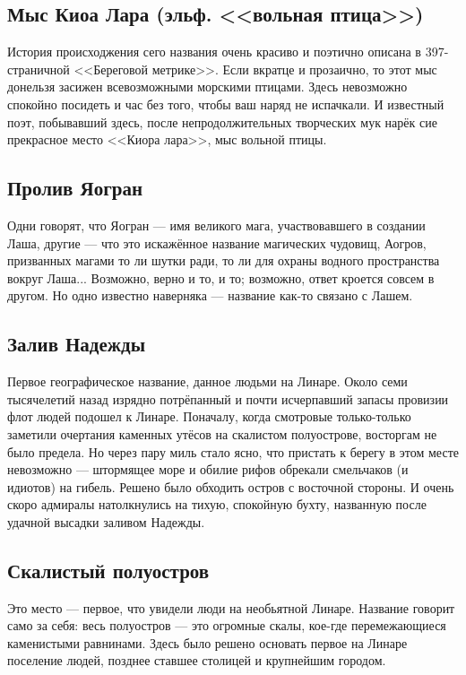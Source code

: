 \documentclass[12pt,a4paper]{book}
\begin{document}
\subsection{Мыс Киоа Лара (эльф. <<вольная птица>>)}

История происходжения сего названия очень красиво и поэтично описана в 397-страничной <<Береговой метрике>>. Если вкратце и прозаично, то этот мыс донельзя засижен всевозможными морскими птицами. Здесь невозможно спокойно посидеть и час без того, чтобы ваш наряд не испачкали. И известный поэт, побывавший здесь, после непродолжительных творческих мук нарёк сие прекрасное место <<Киора лара>>, мыс вольной птицы.

\subsection{Пролив Яогран}

Одни говорят, что Яогран --- имя великого мага, участвовавшего в создании Лаша, другие --- что это искажённое название магических чудовищ, Аогров, призванных магами то ли шутки ради, то ли для охраны водного пространства вокруг Лаша... Возможно, верно и то, и то; возможно, ответ кроется совсем в другом. Но одно известно наверняка --- название как-то связано с Лашем.

\subsection{Залив Надежды}

Первое географическое название, данное людьми на Линаре. Около семи тысячелетий назад изрядно потрёпанный и почти исчерпавший запасы провизии флот людей подошел к Линаре. Поначалу, когда смотровые только-только заметили очертания каменных утёсов на скалистом полуострове, восторгам не было предела. Но через пару миль стало ясно, что пристать к берегу в этом месте невозможно --- штормящее море и обилие рифов обрекали смельчаков (и идиотов) на гибель. Решено было обходить остров с восточной стороны. И очень скоро адмиралы натолкнулись на тихую, спокойную бухту, названную после удачной высадки заливом Надежды.

\subsection{Скалистый полуостров}

Это место --- первое, что увидели люди на необьятной Линаре. Название говорит само за себя: весь полуостров --- это огромные скалы, кое-где перемежающиеся каменистыми равнинами. Здесь было решено основать первое на Линаре поселение людей, позднее ставшее столицей и крупнейшим городом.
\end{document}
